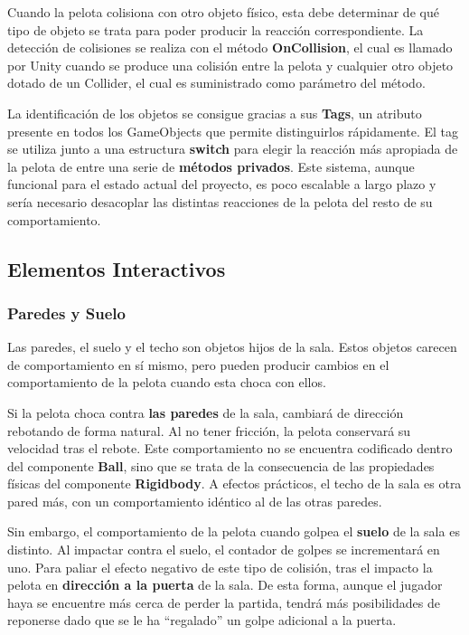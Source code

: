 Cuando la pelota colisiona con otro objeto físico, esta debe determinar de qué tipo de objeto se trata para poder producir la reacción correspondiente. La detección de colisiones se realiza con el método \textbf{OnCollision}, el cual es llamado por Unity cuando se produce una colisión entre la pelota y cualquier otro objeto dotado de un Collider, el cual es suministrado como parámetro del método. 

La identificación de los objetos se consigue gracias a sus \textbf{Tags}, un atributo presente en todos los GameObjects que permite distinguirlos rápidamente. El tag se utiliza junto a una estructura \textbf{switch} para elegir la reacción más apropiada de la pelota de entre una serie de \textbf{métodos privados}. Este sistema, aunque funcional para el estado actual del proyecto, es poco escalable a largo plazo y sería necesario desacoplar las distintas reacciones de la pelota del resto de su comportamiento. 

\subsection{Elementos Interactivos}
\subsubsection{Paredes y Suelo}
Las paredes, el suelo y el techo son objetos hijos de la sala. Estos objetos carecen de comportamiento en sí mismo, pero pueden producir cambios en el comportamiento de la pelota cuando esta choca con ellos.

Si la pelota choca contra \textbf{las paredes} de la sala, cambiará de dirección rebotando de forma natural. Al no tener fricción, la pelota conservará su velocidad tras el rebote. Este comportamiento no se encuentra codificado dentro del componente \textbf{Ball}, sino que se trata de la consecuencia de las propiedades físicas del componente \textbf{Rigidbody}. A efectos prácticos, el techo de la sala es otra pared más, con un comportamiento idéntico al de las otras paredes.

Sin embargo, el comportamiento de la pelota cuando golpea el \textbf{suelo} de la sala es distinto. Al impactar contra el suelo, el contador de golpes se incrementará en uno. Para paliar el efecto negativo de este tipo de colisión, tras el impacto la pelota en \textbf{dirección a la puerta} de la sala. De esta forma, aunque el jugador haya se encuentre más cerca de perder la partida, tendrá más posibilidades de reponerse dado que se le ha ``regalado'' un golpe adicional  a la puerta. 

